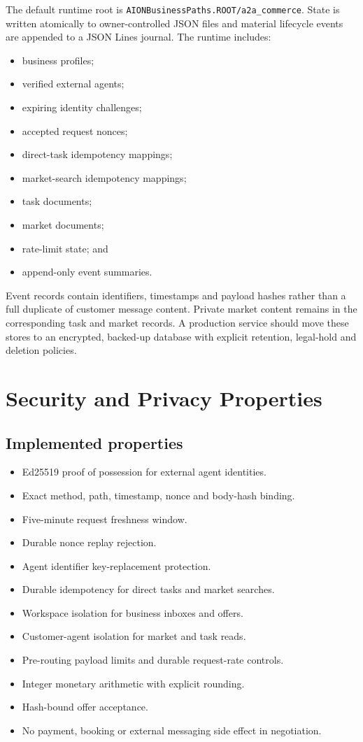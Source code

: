 \documentclass[11pt,a4paper]{article}
\newcommand{\code}[1]{\texttt{#1}}
\begin{document}
The default runtime root is
\code{AIONBusinessPaths.ROOT/a2a\_commerce}.  State is written atomically to
owner-controlled JSON files and material lifecycle events are appended to a
JSON Lines journal.  The runtime includes:

\begin{itemize}
  \item business profiles;
  \item verified external agents;
  \item expiring identity challenges;
  \item accepted request nonces;
  \item direct-task idempotency mappings;
  \item market-search idempotency mappings;
  \item task documents;
  \item market documents;
  \item rate-limit state; and
  \item append-only event summaries.
\end{itemize}

Event records contain identifiers, timestamps and payload hashes rather than a
full duplicate of customer message content.  Private market content remains in
the corresponding task and market records.  A production service should move
these stores to an encrypted, backed-up database with explicit retention,
legal-hold and deletion policies.

\section{Security and Privacy Properties}

\subsection{Implemented properties}

\begin{itemize}
  \item Ed25519 proof of possession for external agent identities.
  \item Exact method, path, timestamp, nonce and body-hash binding.
  \item Five-minute request freshness window.
  \item Durable nonce replay rejection.
  \item Agent identifier key-replacement protection.
  \item Durable idempotency for direct tasks and market searches.
  \item Workspace isolation for business inboxes and offers.
  \item Customer-agent isolation for market and task reads.
  \item Pre-routing payload limits and durable request-rate controls.
  \item Integer monetary arithmetic with explicit rounding.
  \item Hash-bound offer acceptance.
  \item No payment, booking or external messaging side effect in negotiation.
\end{itemize}
\end{document}
